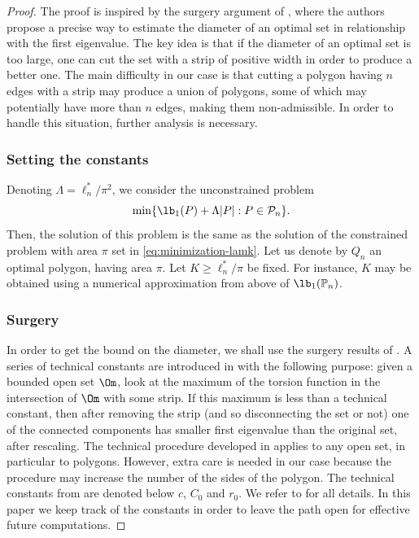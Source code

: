 \begin{proof}
The proof is inspired by the surgery argument of \cite{BuMa15}, where the authors propose a precise way to estimate the diameter of an optimal set in relationship with the first eigenvalue. The key idea is that if the diameter of an optimal set is too large, one can cut the set with a strip of positive width in order to produce a better one. The main difficulty in our case is that cutting a polygon having $n$ edges with a strip may produce a union of polygons, some of which may potentially have more than $n$ edges, making them non-admissible. In order to handle this situation, further analysis is necessary.

\subsubsection*{Setting the constants}
Denoting $\Lambda= \ell_n^*/\pi^2 $, we consider
the unconstrained problem
\begin{equation}\label{bobu203}
\min \{ \lb_1(P) + \Lambda |P|: P \in {\mathcal P_n}\}.
\end{equation}
Then, the solution of this problem is the same as the solution of the constrained problem with area $\pi$ set in \eqref{eq:minimization-lamk}. Let us denote by $Q_n$ an optimal polygon, having area $\pi$. Let $K \ge \ell_n^*/\pi$ be fixed. For instance, $K$ may be obtained using a numerical approximation from above of $\lb_1(\Bbb P_n)$.

\subsubsection*{Surgery}
In order to get the bound on the diameter, we shall use the surgery results of \cite{BuMa15}. A series of technical constants are introduced in \cite{BuMa15} with the following purpose: given a bounded open set $\Om$, look at the maximum of the torsion function in the intersection of $\Om$ with some strip. If this maximum is less than a technical constant, then after removing the strip (and so disconnecting the set or not) one of the connected components has smaller first eigenvalue than the original set, after rescaling. The technical procedure developed in \cite{BuMa15} applies to any open set, in particular to polygons. However, extra care is needed in our case because the procedure may increase the number of the sides of the polygon. The technical constants from
\cite{BuMa15} are denoted below $c$, $C_0$ and $r_0$. We refer to \cite{BuMa15} for all details. In this paper we keep track of the constants in order to leave the path open for effective future computations.


\end{proof}
